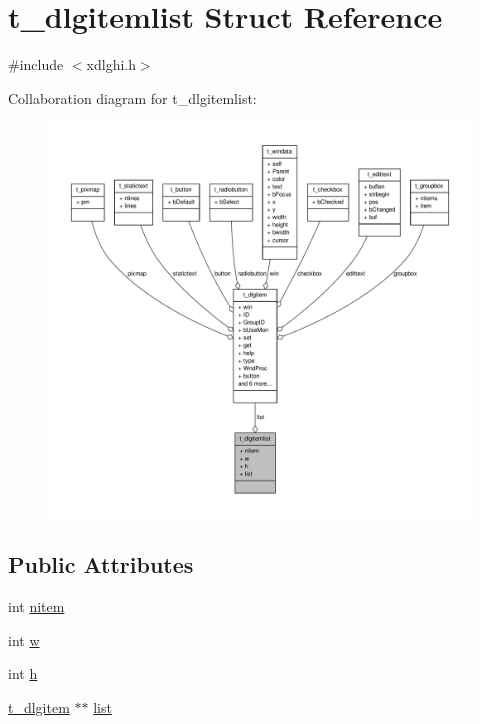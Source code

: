 \hypertarget{structt__dlgitemlist}{\section{t\-\_\-dlgitemlist \-Struct \-Reference}
\label{structt__dlgitemlist}
}


{\ttfamily \#include $<$xdlghi.\-h$>$}



\-Collaboration diagram for t\-\_\-dlgitemlist\-:
\nopagebreak
\begin{figure}[H]
\begin{center}
\leavevmode
\includegraphics[width=350pt]{structt__dlgitemlist__coll__graph}
\end{center}
\end{figure}
\subsection*{\-Public \-Attributes}
\begin{DoxyCompactItemize}
\item 
int \hyperlink{structt__dlgitemlist_a23e9265445f71021ded9f5df2cc38294}{nitem}
\item 
int \hyperlink{structt__dlgitemlist_ab911183e3df65e97b452989df1ea5811}{w}
\item 
int \hyperlink{structt__dlgitemlist_ac970f848e0cb0b46e8bdf144401838b5}{h}
\item 
\hyperlink{structt__dlgitem}{t\-\_\-dlgitem} $\ast$$\ast$ \hyperlink{structt__dlgitemlist_a9d7f72fd8f45a7720bd49253697bea6c}{list}
\end{DoxyCompactItemize}


